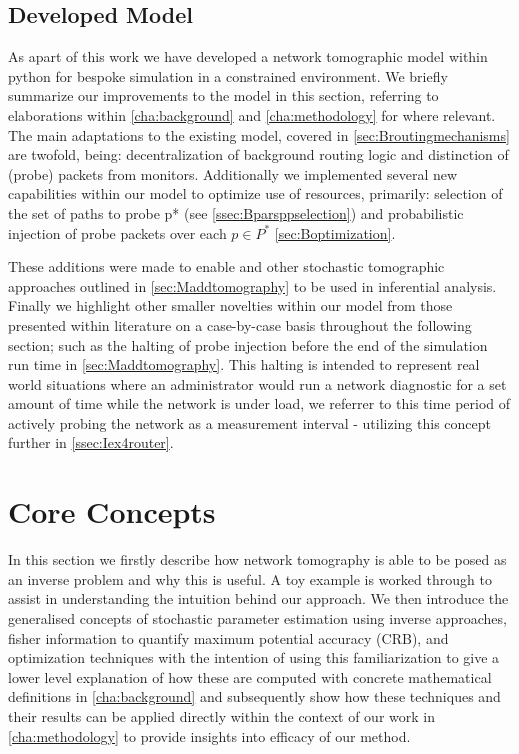 \subsection{Developed Model}
\label{ssec:Idevelopedmodels}
As apart of this work we have developed a network tomographic model within python for bespoke simulation in a constrained environment. We briefly summarize our improvements to the model in this section, referring to elaborations within \cref{cha:background} and \cref{cha:methodology} for where relevant. The main adaptations to the existing model, covered in \cref{sec:Broutingmechanisms} are twofold, being: decentralization of background routing logic and distinction of (probe) packets from monitors. Additionally we implemented several new capabilities within our model to optimize use of resources, primarily: selection of the set of paths to probe \gls{p*} (see \cref{ssec:Bparsppselection}) and probabilistic injection of probe packets over each $p\in P^*$ \cref{sec:Boptimization}.\par
These additions were made to enable \pdv and other stochastic tomographic approaches outlined in \cref{sec:Maddtomography} to be used in inferential analysis. Finally we highlight other smaller novelties within our model from those presented within literature on a case-by-case basis throughout the following section; such as the halting of probe injection before the end of the simulation run time in \cref{sec:Maddtomography}. This halting is intended to represent real world situations where an administrator would run a network diagnostic for a set amount of time while the network is under load, we referrer to this time period of actively probing the network as a measurement interval - utilizing this concept further in \cref{ssec:Iex4router}.

\newpage

\section{Core Concepts}
\label{sec:Icoreconcepts}

In this section we firstly describe how network tomography is able to be posed as an inverse problem and why this is useful. A toy example is worked through to assist in understanding the intuition behind our approach. We then introduce the generalised concepts of stochastic parameter estimation using inverse approaches, fisher information to quantify maximum potential accuracy (CRB), and optimization techniques with the intention of using this familiarization to give a lower level explanation of how these are computed with concrete mathematical definitions in \cref{cha:background} and subsequently show how these techniques and their results can be applied directly within the context of our work in \cref{cha:methodology} to provide insights into efficacy of our method.

